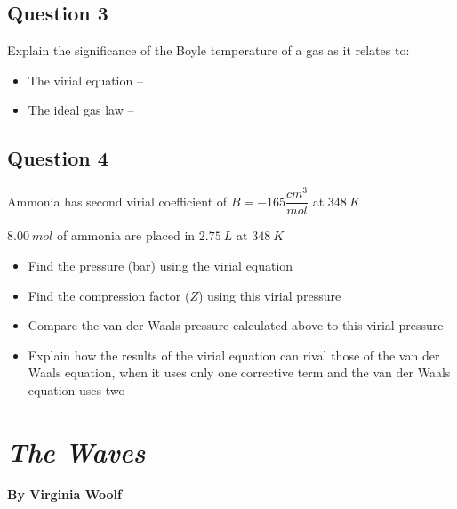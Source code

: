 \documentclass[11pt, letterpaper]{memoir}
\begin{document}
{\vspace{6em}
\subsection*{Question 3}
Explain the significance of the Boyle temperature of a gas as it relates to:
\begin{itemize}
	\item The virial equation --
	
	\vspace{4em}
	\item The ideal gas law --
\end{itemize}

\vspace{4em}
\subsection*{Question 4}
Ammonia has second virial coefficient of $B=-165\dfrac{cm^3}{mol}$ at $348~K$

\noindent $8.00~mol$ of ammonia are placed in $2.75~L$ at $348~K$ 
\begin{itemize}
	\item Find the pressure (bar) using the virial equation
	
	\vspace{4em}
	\item Find the compression factor ($Z$) using this virial pressure
	
	\vspace{4em}
	\item Compare the van der Waals pressure calculated above to this virial pressure
	
	\vspace{4em}
	\item Explain how the results of the virial equation can rival those of the van der Waals equation, when it uses only one corrective term and the van der Waals equation uses two
\end{itemize}

\newpage
{}
\pagestyle{empty}
\addtocounter{page}{-1}
\section*{\emph{The Waves}}
\paragraph{By Virginia Woolf}~

}
\end{document}
